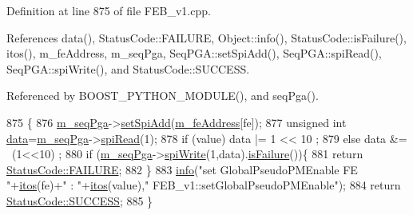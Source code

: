 Definition at line 875 of file F\+E\+B\+\_\+v1.\+cpp.



References data(), Status\+Code\+::\+F\+A\+I\+L\+U\+RE, Object\+::info(), Status\+Code\+::is\+Failure(), itos(), m\+\_\+fe\+Address, m\+\_\+seq\+Pga, Seq\+P\+G\+A\+::set\+Spi\+Add(), Seq\+P\+G\+A\+::spi\+Read(), Seq\+P\+G\+A\+::spi\+Write(), and Status\+Code\+::\+S\+U\+C\+C\+E\+SS.



Referenced by B\+O\+O\+S\+T\+\_\+\+P\+Y\+T\+H\+O\+N\+\_\+\+M\+O\+D\+U\+L\+E(), and seq\+Pga().


\begin{DoxyCode}
875                                                               \{
876   \hyperlink{classFEB__v1_a6c7804ac86796f233a8393043adf2e77}{m\_seqPga}->\hyperlink{classSeqPGA_ac998ce3a6d9b5f2e88cc8393f8c1df53}{setSpiAdd}(\hyperlink{classFEB__v1_a4e1945c2d5b434125f375e9d0fc6d99f}{m\_feAddress}[fe]);
877   \textcolor{keywordtype}{unsigned} \textcolor{keywordtype}{int} \hyperlink{classFEB__v1_a6bca4320bd3bbbc32efc81097f33421a}{data}=\hyperlink{classFEB__v1_a6c7804ac86796f233a8393043adf2e77}{m\_seqPga}->\hyperlink{classSeqPGA_ab3d0e5e5d4014bc7a92588a76b8713d4}{spiRead}(1);
878   \textcolor{keywordflow}{if} (value)  data |= 1 << 10 ;
879   \textcolor{keywordflow}{else}        data &= ~(1<<10) ;
880   \textcolor{keywordflow}{if} (\hyperlink{classFEB__v1_a6c7804ac86796f233a8393043adf2e77}{m\_seqPga}->\hyperlink{classSeqPGA_ad4421841ce4ce8b88ad13f63216f0743}{spiWrite}(1,data).\hyperlink{classStatusCode_a5dd22dc6eb2c52fc4cabc58f6dea2eb7}{isFailure}())\{
881     \textcolor{keywordflow}{return} \hyperlink{classStatusCode_a6f565cbeadc76d14c72f047e5e85eb4ba3da73d4c469762eb9d3c960368252b26}{StatusCode::FAILURE};
882   \}
883   \hyperlink{classObject_a644fd329ea4cb85f54fa6846484b84a8}{info}(\textcolor{stringliteral}{"set GlobalPseudoPMEnable FE "}+\hyperlink{Tools_8h_af330027dbdafb9a30768b3613c553e60}{itos}(fe)+\textcolor{stringliteral}{" : "}+\hyperlink{Tools_8h_af330027dbdafb9a30768b3613c553e60}{itos}(value),\textcolor{stringliteral}{"
      FEB\_v1::setGlobalPseudoPMEnable"});
884   \textcolor{keywordflow}{return} \hyperlink{classStatusCode_a6f565cbeadc76d14c72f047e5e85eb4badd0da38d3ba0d922efd1f4619bc37ad8}{StatusCode::SUCCESS};
885 \}
\end{DoxyCode}
\mbox{\label{classObject_a398fe08cba594a0ce6891d59fe4f159f}} 
